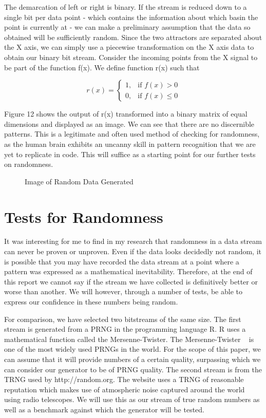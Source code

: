 \documentclass[jou,apacite]{apa6}
\begin{document}
The demarcation of left or right is binary. If the stream is reduced down to a single bit per data point - which contains the information about which basin the point is currently at - we can make a preliminary assumption that the data so obtained will be sufficiently random. Since the two attractors are separated about the X axis, we can simply use a piecewise transformation on the X axis data to obtain our binary bit stream. Consider the incoming points from the X signal to be part of the function f(x). We define function r(x) such that 

\begin{equation}
r(x) = 
  \begin{cases}
  1, & \text{if } f(x) > 0 \\
  0, & \text{if } f(x) \leqslant 0
  \end{cases}
\end{equation}

Figure 12 shows the output of r(x) transformed into a binary matrix of equal dimensions and displayed as an image. We can see that there are no discernible patterns. This is a legitimate and often used method of checking for randomness, as the human brain exhibits an uncanny skill in pattern recognition that we are yet to replicate in code. This will suffice as a starting point for our further tests on randomness.

\begin{figure}[H]
\caption{Image of Random Data Generated}
\end{figure}

\section{Tests for Randomness}

It was interesting for me to find in my research that randomness in a data stream can never be proven or unproven. Even if the data looks decidedly not random, it is possible that you may have recorded the data stream at a point where a pattern was expressed as a mathematical inevitability. Therefore, at the end of this report we cannot say if the stream we have collected is definitively better or worse than another. We will however, through a number of tests, be able to express our confidence in these numbers being random.

For comparison, we have selected two bitstreams of the same size. The first stream is generated from a PRNG in the programming language R. R uses a mathematical function called the Mersenne-Twister. The Mersenne-Twister ~\cite{mako} is one of the most widely used PRNGs in the world. For the scope of this paper, we can assume that it will provide numbers of a certain quality, surpassing which we can consider our generator to be of PRNG quality. The second stream is from the TRNG used by http://random.org. The website uses a TRNG of reasonable reputation which makes use of atmospheric noise captured around the world using radio telescopes. We will use this as our stream of true random numbers as well as a benchmark against which the generator will be tested.
\end{document}
